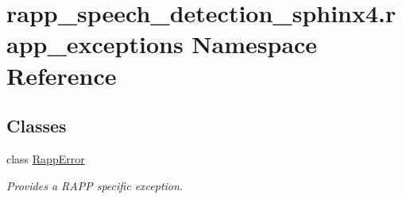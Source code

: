 \hypertarget{namespacerapp__speech__detection__sphinx4_1_1rapp__exceptions}{\section{rapp\-\_\-speech\-\_\-detection\-\_\-sphinx4.\-rapp\-\_\-exceptions Namespace Reference}
\label{namespacerapp__speech__detection__sphinx4_1_1rapp__exceptions}
}
\subsection*{Classes}
\begin{DoxyCompactItemize}
\item 
class \hyperlink{classrapp__speech__detection__sphinx4_1_1rapp__exceptions_1_1RappError}{Rapp\-Error}
\begin{DoxyCompactList}\small\item\em Provides a R\-A\-P\-P specific exception. \end{DoxyCompactList}\end{DoxyCompactItemize}
